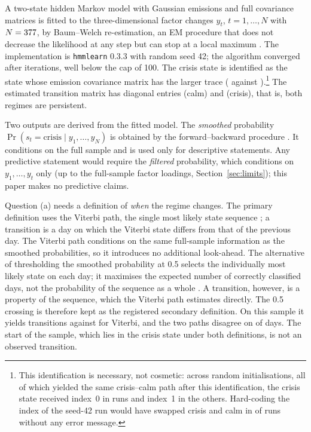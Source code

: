 \documentclass[11pt,a4paper]{article}
\begin{document}
A two-state hidden Markov model with Gaussian emissions and full covariance matrices is fitted to the three-dimensional factor changes $y_t$, $t=1,\dots,N$ with $N=377$, by Baum--Welch re-estimation, an EM procedure that does not decrease the likelihood at any step but can stop at a local maximum \citep[Sec.~III-C]{rabiner1989}. The implementation is \texttt{hmmlearn} 0.3.3 \citep{hmmlearn} with random seed 42; the algorithm converged after \Iter{} iterations, well below the cap of 100. The crisis state is identified as the state whose emission covariance matrix has the larger trace (\TrCrisis{} against \TrCalm).\footnote{This identification is necessary, not cosmetic: across \NStarts{} random initialisations, all of which yielded the same crisis--calm path after this identification, the crisis state received index~0 in \NStartsIdxZero{} runs and index~1 in the others. Hard-coding the index of the seed-42 run would have swapped crisis and calm in \NStartsIdxZero{} of \NStarts{} runs without any error message.} The estimated transition matrix has diagonal entries \PStayCalm{} (calm) and \PStayCrisis{} (crisis), that is, both regimes are persistent.

Two outputs are derived from the fitted model. The \emph{smoothed} probability $\Pr(s_t=\text{crisis}\mid y_1,\dots,y_N)$ is obtained by the forward--backward procedure \citep[eqs.~26--27]{rabiner1989}. It conditions on the full sample and is used only for descriptive statements. Any predictive statement would require the \emph{filtered} probability, which conditions on $y_1,\dots,y_t$ only (up to the full-sample factor loadings, Section~\ref{sec:limits}); this paper makes no predictive claims.

Question (a) needs a definition of \emph{when} the regime changes. The primary definition uses the Viterbi path, the single most likely state sequence \citep[p.~264]{rabiner1989}; a transition is a day on which the Viterbi state differs from that of the previous day. The Viterbi path conditions on the same full-sample information as the smoothed probabilities, so it introduces no additional look-ahead. The alternative of thresholding the smoothed probability at 0.5 selects the individually most likely state on each day; it maximises the expected number of correctly classified days, not the probability of the sequence as a whole \citep[p.~264]{rabiner1989}. A transition, however, is a property of the sequence, which the Viterbi path estimates directly. The 0.5 crossing is therefore kept as the registered secondary definition. On this sample it yields \NSwitchCross{} transitions against \NSwitch{} for Viterbi, and the two paths disagree on \NDisagree{} of \NDays{} days. The start of the sample, which lies in the crisis state under both definitions, is not an observed transition.
\end{document}
